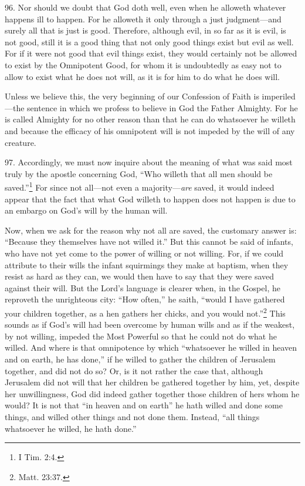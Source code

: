 96. Nor should we doubt that God doth well, even when he alloweth whatever happens ill to happen. For he alloweth it only through a just judgment—and surely all that is just is good. Therefore, although evil, in so far as it is evil, is not good, still it is a good thing that not only good things exist but evil as well. For if it were not good that evil things exist, they would certainly not be allowed to exist by the Omnipotent Good, for whom it is undoubtedly as easy not to allow to exist what he does not will, as it is for him to do what he does will.

Unless we believe this, the very beginning of our Confession of Faith is imperiled—the sentence in which we profess to believe in God the Father Almighty. For he is called Almighty for no other reason than that he can do whatsoever he willeth and because the efficacy of his omnipotent will is not impeded by the will of any creature.

97. Accordingly, we must now inquire about the meaning of what was said most truly by the apostle concerning God, ``Who willeth that all men should be saved.''\footnote{I Tim. 2:4.} For since not all—not even a majority—\emph{are} saved, it would indeed appear that the fact that what God willeth to happen does not happen is due to an embargo on God's will by the human will.

Now, when we ask for the reason why not all are saved, the customary answer is: ``Because they themselves have not willed it.'' But this cannot be said of infants, who have not yet come to the power of willing or not willing. For, if we could attribute to their wills the infant squirmings they make at baptism, when they resist as hard as they can, we would then have to say that they were saved against their will. But the Lord's language is clearer when, in the Gospel, he reproveth the unrighteous city: ``How often,'' he saith, ``would I have gathered your children together, as a hen gathers her chicks, and you would not.''\footnote{Matt. 23:37.} This sounds as if God's will had been overcome by human wills and as if the weakest, by not willing, impeded the Most Powerful so that he could not do what he willed. And where is that omnipotence by which ``whatsoever he willed in heaven and on earth, he has done,'' if he willed to gather the children of Jerusalem together, and did not do so? Or, is it not rather the case that, although Jerusalem did not will that her children be gathered together by him, yet, despite her unwillingness, God did indeed gather together those children of hers whom he would? It is not that ``in heaven and on earth'' he hath willed and done some things, and willed other things and not done them. Instead, ``all things whatsoever he willed, he hath done.''

